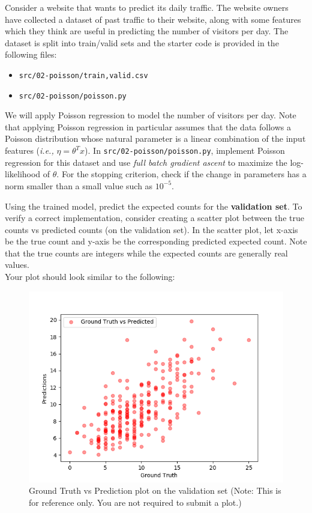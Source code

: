 \item {}

Consider a website that wants to predict its daily traffic. The website owners have collected a dataset of past traffic to their website, along with some features which they think are useful in
predicting the number of visitors per day. The dataset is split into train/valid sets and the starter code is provided in the following files:
\begin{center}
    \begin{itemize}
        \item 	\texttt{src/02-poisson/{train,valid}.csv}
        \item   \texttt{src/02-poisson/poisson.py}
    \end{itemize}
\end{center}
We will apply Poisson regression to model the number of visitors per day. Note that applying Poisson regression in particular assumes that the data follows a Poisson distribution whose natural parameter is a linear combination of the input features (\emph{i.e.,} $\eta = \theta^T x$). In \texttt{src/02-poisson/poisson.py}, implement Poisson regression for this dataset and use \emph{full batch gradient ascent} to maximize the log-likelihood of $\theta$. For the stopping criterion, check if the change in parameters has a norm smaller than a small value such as $10^{-5}$.

Using the trained model, predict the expected counts for the \textbf{validation set}.  To verify a correct implementation, consider creating a scatter plot between the true counts vs predicted counts (on the validation set). In the scatter plot, let x-axis be the true count and y-axis be the corresponding predicted expected count. Note that the true counts are integers while the expected counts are generally real values.\\

Your plot should look similar to the following:

\begin{figure}[H]
	\centering
	\vspace{-2mm}
	\includegraphics[width=0.65\linewidth]{02-poisson/poisson_val.png}
	\caption{Ground Truth vs Prediction plot on the validation set (Note: This is for reference only.  You are not required to submit a plot.)}
\end{figure}
